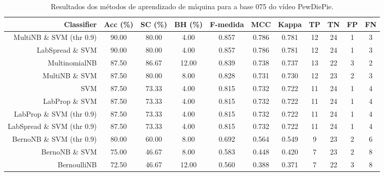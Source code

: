 \begin{table}[!htb]
\centering
\caption{Resultados dos métodos de aprendizado de máquina para a base 075 do vídeo PewDiePie.}
\label{tab:PewDiePie-075}
\begin{tabular}{r|c|c|c|c|c|c|c|c|c|c}
\hline\hline
Classifier & Acc (\%) & SC (\%) & BH (\%) & F-medida & MCC & Kappa & TP & TN & FP & FN \\ \hline
MultiNB \& SVM (thr 0.9) & 90.00 & 80.00 & 4.00 & 0.857 & 0.786 & 0.781 & 12 & 24 & 1 & 3 \\ 
LabSpread \& SVM & 90.00 & 80.00 & 4.00 & 0.857 & 0.786 & 0.781 & 12 & 24 & 1 & 3 \\ 
MultinomialNB & 87.50 & 86.67 & 12.00 & 0.839 & 0.738 & 0.737 & 13 & 22 & 3 & 2 \\ 
MultiNB \& SVM & 87.50 & 80.00 & 8.00 & 0.828 & 0.731 & 0.730 & 12 & 23 & 2 & 3 \\ 
SVM & 87.50 & 73.33 & 4.00 & 0.815 & 0.732 & 0.722 & 11 & 24 & 1 & 4 \\ 
LabProp \& SVM & 87.50 & 73.33 & 4.00 & 0.815 & 0.732 & 0.722 & 11 & 24 & 1 & 4 \\ 
LabProp \& SVM (thr 0.9) & 87.50 & 73.33 & 4.00 & 0.815 & 0.732 & 0.722 & 11 & 24 & 1 & 4 \\ 
LabSpread \& SVM (thr 0.9) & 87.50 & 73.33 & 4.00 & 0.815 & 0.732 & 0.722 & 11 & 24 & 1 & 4 \\ 
BernoNB \& SVM (thr 0.9) & 80.00 & 60.00 & 8.00 & 0.692 & 0.564 & 0.549 & 9 & 23 & 2 & 6 \\ 
BernoNB \& SVM & 75.00 & 46.67 & 8.00 & 0.583 & 0.448 & 0.420 & 7 & 23 & 2 & 8 \\ 
BernoulliNB & 72.50 & 46.67 & 12.00 & 0.560 & 0.388 & 0.371 & 7 & 22 & 3 & 8 \\ 
\hline\hline
\end{tabular}
\end{table}
